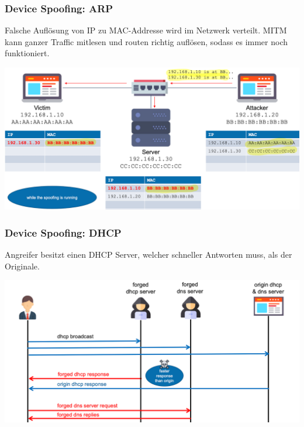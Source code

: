 \subsubsection{Device Spoofing: ARP}
Falsche Auflösung von IP zu MAC-Addresse wird im Netzwerk verteilt. MITM kann ganzer Traffic mitlesen und routen richtig auflösen, sodass es immer noch funktioniert.
\begin{center}
    \vspace{-4pt}
    \includegraphics[width=1\linewidth]{./img/09-mitm/arp}
    \vspace{-8pt}
\end{center}
\vspace{-8pt}
\subsubsection{Device Spoofing: DHCP}
Angreifer besitzt einen DHCP Server, welcher schneller Antworten muss, als der Originale.
\begin{center}
    \vspace{-8pt}
    \includegraphics[width=1.0\linewidth]{./img/09-mitm/dhcp}
    \vspace{-8pt}
\end{center}
